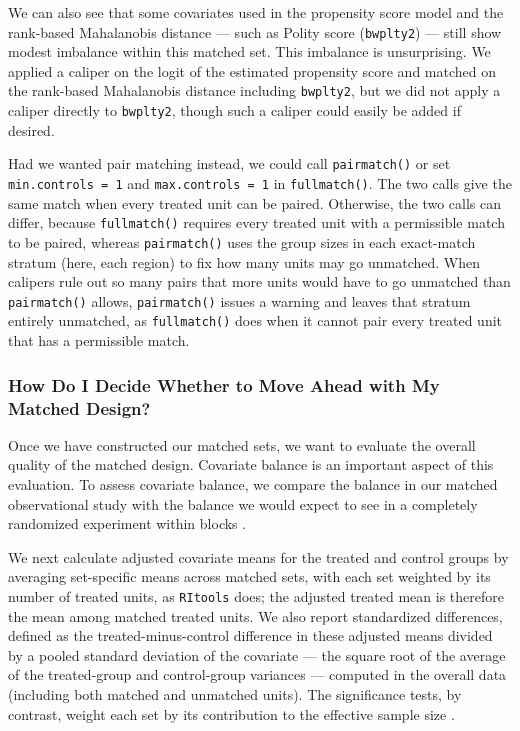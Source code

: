 \documentclass[
  12pt,
  leqno]{article}
\begin{document}
We can also see that some covariates used in the propensity score model
and the rank-based Mahalanobis distance --- such as Polity score
(\texttt{bwplty2}) --- still show modest imbalance within this matched
set. This imbalance is unsurprising. We applied a caliper on the logit
of the estimated propensity score and matched on the rank-based
Mahalanobis distance including \texttt{bwplty2}, but we did not apply a
caliper directly to \texttt{bwplty2}, though such a caliper could easily
be added if desired.

Had we wanted pair matching instead, we could call \texttt{pairmatch()}
or set \texttt{min.controls\ =\ 1} and \texttt{max.controls\ =\ 1} in
\texttt{fullmatch()}. The two calls give the same match when every
treated unit can be paired. Otherwise, the two calls can differ, because
\texttt{fullmatch()} requires every treated unit with a permissible
match to be paired, whereas \texttt{pairmatch()} uses the group sizes in
each exact-match stratum (here, each region) to fix how many units may
go unmatched. When calipers rule out so many pairs that more units would
have to go unmatched than \texttt{pairmatch()} allows,
\texttt{pairmatch()} issues a warning and leaves that stratum entirely
unmatched, as \texttt{fullmatch()} does when it cannot pair every
treated unit that has a permissible match.

\subsubsection{How Do I Decide Whether to Move Ahead with My Matched
Design?}\label{how-do-i-decide-whether-to-move-ahead-with-my-matched-design}

Once we have constructed our matched sets, we want to evaluate the
overall quality of the matched design. Covariate balance is an important
aspect of this evaluation. To assess covariate balance, we compare the
balance in our matched observational study with the balance we would
expect to see in a completely randomized experiment within blocks
\citep{hansenbowers2008}.

We next calculate adjusted covariate means for the treated and control
groups by averaging set-specific means across matched sets, with each
set weighted by its number of treated units, as \texttt{RItools} does;
the adjusted treated mean is therefore the mean among matched treated
units. We also report standardized differences, defined as the
treated-minus-control difference in these adjusted means divided by a
pooled standard deviation of the covariate --- the square root of the
average of the treated-group and control-group variances --- computed in
the overall data (including both matched and unmatched units). The
significance tests, by contrast, weight each set by its contribution to
the effective sample size \citep{hansenbowers2008}.
\end{document}

